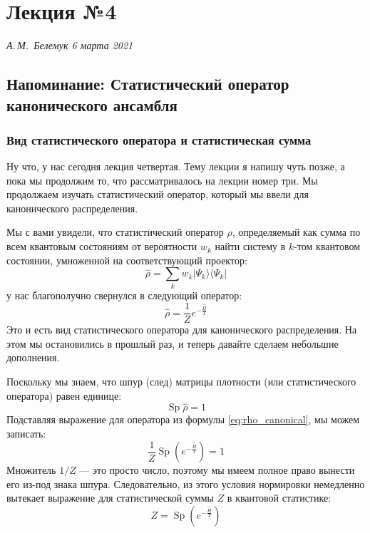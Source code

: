 \documentclass[../general/general]{subfiles}
\begin{document}
\chapter{Лекция №4}
\noindent\textit{А.\,М.~Белемук \hfill 6 марта 2021}
\vspace{1em}
\ifSubfilesClassLoaded{\tableofcontents\newpage}{}



\section{Напоминание: Статистический оператор канонического ансамбля}

\subsection{Вид статистического оператора и статистическая сумма}

Ну что, у нас сегодня лекция четвертая. Тему лекции я напишу чуть позже, а пока мы продолжим то, что рассматривалось на лекции номер три. Мы продолжаем изучать статистический оператор, который мы ввели для канонического распределения.

Мы с вами увидели, что статистический оператор $\hat{\rho}$, определяемый как сумма по всем квантовым состояниям от вероятности $w_k$ найти систему в $k$-том квантовом состоянии, умноженной на соответствующий проектор:
\begin{equation*}
    \hat{\rho} = \sum_k w_k |\Psi_k\rangle \langle \Psi_k|
\end{equation*}
у нас благополучно свернулся в следующий оператор:
\begin{equation}
    \hat{\rho} = \frac{1}{Z} e^{-\frac{\hat{H}}{T}}
    \label{eq:rho_canonical}
\end{equation}
Это и есть вид статистического оператора для канонического распределения. На этом мы остановились в прошлый раз, и теперь давайте сделаем небольшие дополнения.

Поскольку мы знаем, что шпур (след) матрицы плотности (или статистического оператора) равен единице:
\begin{equation*}
    \operatorname{Sp}\hat{\rho} = 1
\end{equation*}
Подставляя выражение для оператора из формулы \eqref{eq:rho_canonical}, мы можем записать:
\begin{equation*}
    \frac{1}{Z} \operatorname{Sp} \left( e^{-\frac{\hat{H}}{T}} \right) = 1
\end{equation*}
Множитель $1/Z$ — это просто число, поэтому мы имеем полное право вынести его из-под знака шпура. Следовательно, из этого условия нормировки немедленно вытекает выражение для статистической суммы $Z$ в квантовой статистике:
\begin{equation}
    Z = \operatorname{Sp} \left( e^{-\frac{\hat{H}}{T}} \right)
    \label{eq:Z_quantum}
\end{equation}
\end{document}
